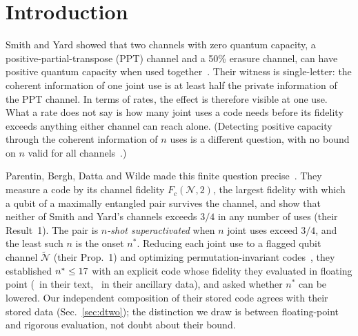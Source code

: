 \documentclass[aps,pra,twocolumn,superscriptaddress,nofootinbib,longbibliography,floatfix]{revtex4-2}
\newcommand{\nt}{\widetilde{\mathcal N}}
\begin{document}
\section{Introduction}
\label{sec:intro}

Smith and Yard showed that two channels with zero quantum capacity, a positive-partial-transpose (PPT) channel and a 50\% erasure channel, can have positive quantum capacity when used together~\cite{smith2008quantum}. Their witness is single-letter: the coherent information of one joint use is at least half the private information of the PPT channel. In terms of rates, the effect is therefore visible at one use. What a rate does not say is how many joint uses a code needs before its fidelity exceeds anything either channel can reach alone. (Detecting positive capacity through the coherent information of $n$ uses is a different question, with no bound on $n$ valid for all channels~\cite{cubitt2015unbounded}.)

Parentin, Bergh, Datta and Wilde made this finite question precise~\cite{parentin2026onset}. They measure a code by its channel fidelity $F_c(\mathcal N,2)$, the largest fidelity with which a qubit of a maximally entangled pair survives the channel, and show that neither of Smith and Yard's channels exceeds $3/4$ in any number of uses (their Result~1). The pair is \emph{$n$-shot superactivated} when $n$ joint uses exceed $3/4$, and the least such $n$ is the onset $n^*$. Reducing each joint use to a flagged qubit channel $\nt$ (their Prop.~1) and optimizing permutation-invariant codes~\cite{bergh2026permutation}, they established $n^*\le17$ with an explicit code whose fidelity they evaluated in floating point (\PubFPrinted\ in their text, \PubF\ in their ancillary data), and asked whether $n^*$ can be lowered. Our independent composition of their stored code agrees with their stored data (Sec.~\ref{sec:dtwo}); the distinction we draw is between floating-point and rigorous evaluation, not doubt about their bound.
\end{document}
